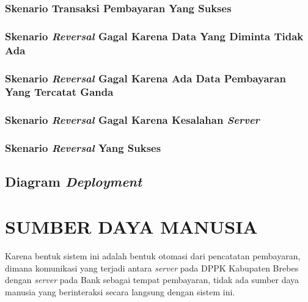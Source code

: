 \documentclass[pdftex,12pt, oneside]{article}
\begin{document}
\subsubsection{Skenario Transaksi Pembayaran Yang Sukses}
\subsubsection{Skenario \textit{Reversal} Gagal Karena Data Yang Diminta Tidak Ada}
\subsubsection{Skenario \textit{Reversal} Gagal Karena Ada Data Pembayaran Yang Tercatat Ganda}
\subsubsection{Skenario \textit{Reversal} Gagal Karena Kesalahan \textit{Server}}
\subsubsection{Skenario \textit{Reversal} Yang Sukses}

\subsection{Diagram \textit{Deployment}}

\section{SUMBER DAYA MANUSIA}

Karena bentuk sistem ini adalah bentuk otomasi dari pencatatan pembayaran, dimana komunikasi yang terjadi antara \textit{server} pada DPPK Kabupaten Brebes dengan \textit{server} pada Bank sebagai tempat pembayaran, tidak ada sumber daya manusia yang berinteraksi secara langsung dengan sistem ini.
\end{document}
